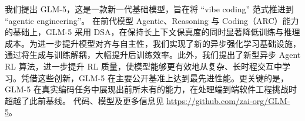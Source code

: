 \vspace{-0.5em}

我们提出 GLM-5，这是一款新一代基础模型，旨在将 ``vibe coding'' 范式推进到 ``agentic engineering''。
 在前代模型 Agentic、Reasoning 与 Coding（ARC）能力的基础上，GLM-5 采用 DSA，在保持长上下文保真度的同时显著降低训练与推理成本。为进一步提升模型对齐与自主性，我们实现了新的异步强化学习基础设施，通过将生成与训练解耦，大幅提升后训练效率。此外，我们提出了新型异步 Agent RL 算法，进一步提升 RL 质量，使模型能够更有效地从复杂、长时程交互中学习。凭借这些创新，GLM-5 在主要公开基准上达到最先进性能。更关键的是，GLM-5 在真实编码任务中展现出前所未有的能力，在处理端到端软件工程挑战时超越了此前基线。
代码、模型及更多信息见 \url{https://github.com/zai-org/GLM-5}。


     



